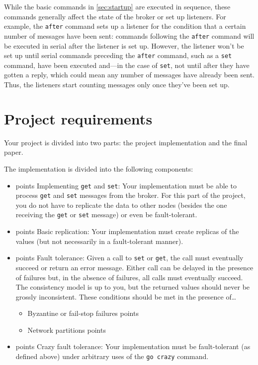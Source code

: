 \documentclass[12pt]{article}
\newcommand{\points}[1]{{\sffamily\mdseries\guillemotleft #1 points\guillemotright{}}}
\begin{document}
While the basic commands in \cref{sec:startup} are executed in sequence, these commands generally affect the state of the broker or set up listeners. For example, the {\tt after} command sets up a listener for the condition that a certain number of messages have been sent: commands following the {\tt after} command will be executed in serial after the listener is set up. However, the listener won't be set up until serial commands preceding the {\tt after} command, such as a {\tt set} command, have been executed and---in the case of {\tt set}, not until after they have gotten a reply, which could mean any number of messages have already been sent. Thus, the listeners start counting messages only once they've been set up.

\section{Project requirements}

Your project is divided into two parts: the project implementation and the final paper.

The implementation is divided into the following components:

\begin{itemize}
\item \points{30} Implementing \texttt{get} and \texttt{set}: Your implementation must be able to process \texttt{get} and \texttt{set} messages from the broker. For this part of the project, you do not have to replicate the data to other nodes (besides the one receiving the \texttt{get} or \texttt{set} message) or even be fault-tolerant.
\item \points{20} Basic replication: Your implementation must create replicas of the values (but not necessarily in a fault-tolerant manner).
\item \points{40} Fault tolerance: Given a call to \texttt{set} or \texttt{get}, the call must eventually succeed or return an error message. Either call can be delayed in the presence of failures but, in the absence of failures, all calls must eventually succeed. The consistency model is up to you, but the returned values should never be grossly inconsistent. These conditions should be met in the presence of\ldots

\begin{itemize}
\item Byzantine or fail-stop failures \points{25}
\item Network partitions \points{15}
\end{itemize}

\item \points{10} Crazy fault tolerance: Your implementation must be fault-tolerant (as defined above) under arbitrary uses of the \texttt{go crazy} command.
\end{itemize}
\end{document}
